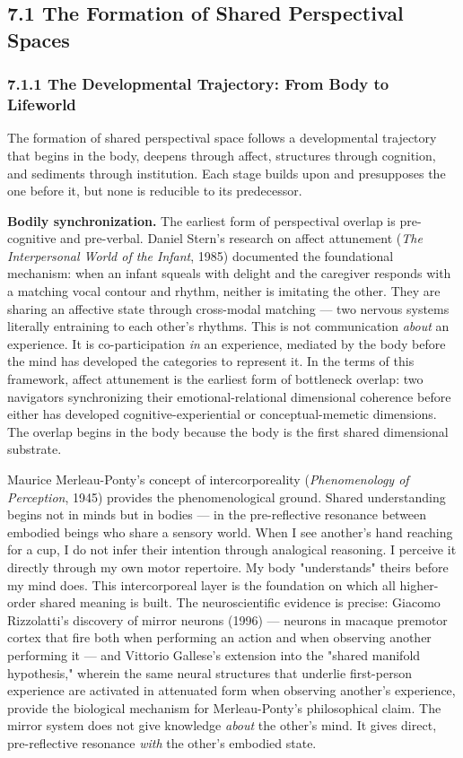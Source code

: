 \subsection*{7.1 The Formation of Shared Perspectival Spaces}


\subsubsection*{7.1.1 The Developmental Trajectory: From Body to Lifeworld}


The formation of shared perspectival space follows a developmental trajectory that begins in the body, deepens through affect, structures through cognition, and sediments through institution. Each stage builds upon and presupposes the one before it, but none is reducible to its predecessor.


\textbf{Bodily synchronization.} The earliest form of perspectival overlap is pre-cognitive and pre-verbal. Daniel Stern's research on affect attunement (\textit{The Interpersonal World of the Infant}, 1985) documented the foundational mechanism: when an infant squeals with delight and the caregiver responds with a matching vocal contour and rhythm, neither is imitating the other. They are sharing an affective state through cross-modal matching — two nervous systems literally entraining to each other's rhythms. This is not communication \textit{about} an experience. It is co-participation \textit{in} an experience, mediated by the body before the mind has developed the categories to represent it. In the terms of this framework, affect attunement is the earliest form of bottleneck overlap: two navigators synchronizing their emotional-relational dimensional coherence before either has developed cognitive-experiential or conceptual-memetic dimensions. The overlap begins in the body because the body is the first shared dimensional substrate.


Maurice Merleau-Ponty's concept of intercorporeality (\textit{Phenomenology of Perception}, 1945) provides the phenomenological ground. Shared understanding begins not in minds but in bodies — in the pre-reflective resonance between embodied beings who share a sensory world. When I see another's hand reaching for a cup, I do not infer their intention through analogical reasoning. I perceive it directly through my own motor repertoire. My body "understands" theirs before my mind does. This intercorporeal layer is the foundation on which all higher-order shared meaning is built. The neuroscientific evidence is precise: Giacomo Rizzolatti's discovery of mirror neurons (1996) — neurons in macaque premotor cortex that fire both when performing an action and when observing another performing it — and Vittorio Gallese's extension into the "shared manifold hypothesis," wherein the same neural structures that underlie first-person experience are activated in attenuated form when observing another's experience, provide the biological mechanism for Merleau-Ponty's philosophical claim. The mirror system does not give knowledge \textit{about} the other's mind. It gives direct, pre-reflective resonance \textit{with} the other's embodied state.


